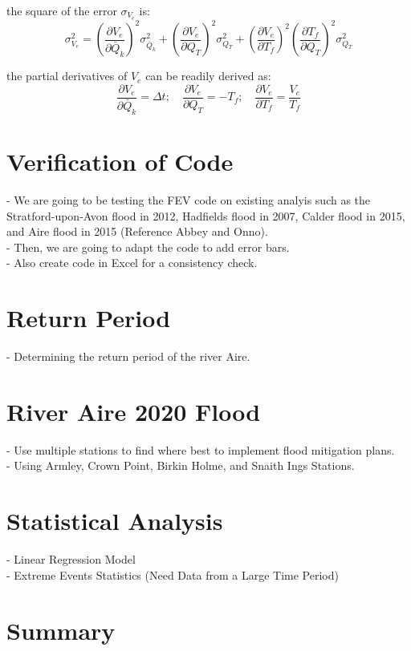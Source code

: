 the square of the error $\sigma_{V_e}$ is:
\[{\sigma_{V_e}^2} = (\frac{\partial V_e}{\partial\bar Q_k})^2{\sigma_{\bar Q_k}^2} + (\frac{\partial V_e}{\partial Q_T})^2{\sigma_{Q_T}^2}+(\frac{\partial V_e}{\partial T_f})^2(\frac{\partial T_f}{\partial Q_T})^2{\sigma_{Q_T}^2}\]

the partial derivatives of $V_e$ can be readily derived as:
\[\frac{\partial V_e}{\partial\bar Q_k} = \Delta t;\quad  \frac{\partial V_e}{\partial Q_T} = -T_f;\quad  \frac{\partial V_e}{\partial T_f} = \frac{V_e}{T_f}\]


\section*{Verification of Code}
- We are going to be testing the FEV code on existing analyis such as the Stratford-upon-Avon flood in 2012, Hadfields flood in 2007, Calder flood in 2015, and Aire flood in 2015 (Reference Abbey and Onno). \\
- Then, we are going to adapt the code to add error bars. \\
- Also create code in Excel for a consistency check. \\

\section*{Return Period}
- Determining the return period of the river Aire. \\

\section*{River Aire 2020 Flood}
- Use multiple stations to find where best to implement flood mitigation plans. \\
- Using Armley, Crown Point, Birkin Holme, and Snaith Ings Stations.

\section*{Statistical Analysis}
- Linear Regression Model \\
- Extreme Events Statistics (Need Data from a Large Time Period)

\section*{Summary}
